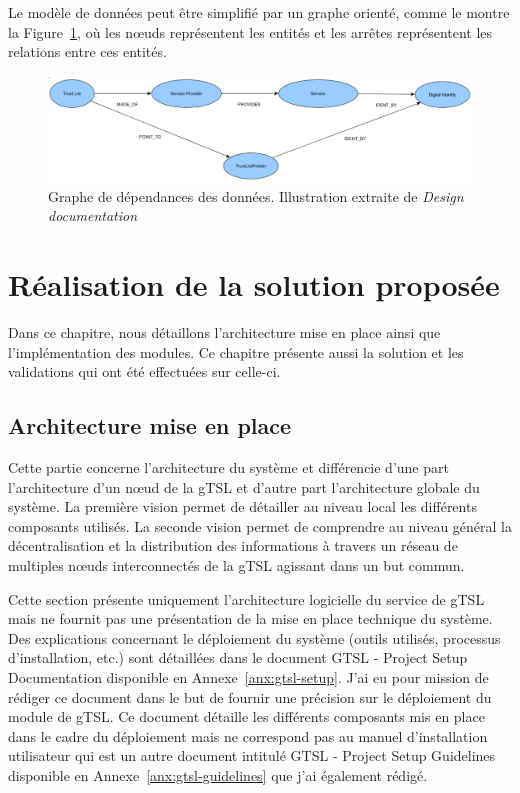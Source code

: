 \documentclass{tnreport}
\begin{document}
Le modèle de données peut être simplifié par un graphe orienté, comme le montre la Figure~\ref{fig:dependencies}, où les nœuds représentent les entités et les arrêtes représentent les relations entre ces entités.

\begin{figure}[h]
	\centering
	\includegraphics[scale=0.42]{figures/dependencies}
	\caption{Graphe de dépendances des données. Illustration extraite de \textit{Design documentation}~\cite{design-document}}
	\label{fig:dependencies}
\end{figure}

\chapter{Réalisation de la solution proposée}
\label{chap:realisation}

Dans ce chapitre, nous détaillons l'architecture mise en place ainsi que l'implémentation des modules. Ce chapitre présente aussi la solution et les validations qui ont été effectuées sur celle-ci.

\section{Architecture mise en place}
\label{sec:architecture}

Cette partie concerne l'architecture du système et différencie d'une part l'architecture d'un nœud de la gTSL et d'autre part l'architecture globale du système. La première vision permet de détailler au niveau local les différents composants utilisés. La seconde vision permet de comprendre au niveau général la décentralisation et la distribution des informations à travers un réseau de multiples nœuds interconnectés de la gTSL agissant dans un but commun.

Cette section présente uniquement l'architecture logicielle du service de gTSL mais ne fournit pas une présentation de la mise en place technique du système. Des explications concernant le déploiement du système (outils utilisés, processus d'installation, etc.) sont détaillées dans le document GTSL - Project Setup Documentation disponible en Annexe~\ref{anx:gtsl-setup}. J'ai eu pour mission de rédiger ce document dans le but de fournir une précision sur le déploiement du module de gTSL. Ce document détaille les différents composants mis en place dans le cadre du déploiement mais ne correspond pas au manuel d'installation utilisateur qui est un autre document intitulé GTSL - Project Setup Guidelines disponible en Annexe~\ref{anx:gtsl-guidelines} que j'ai également rédigé.
\end{document}

